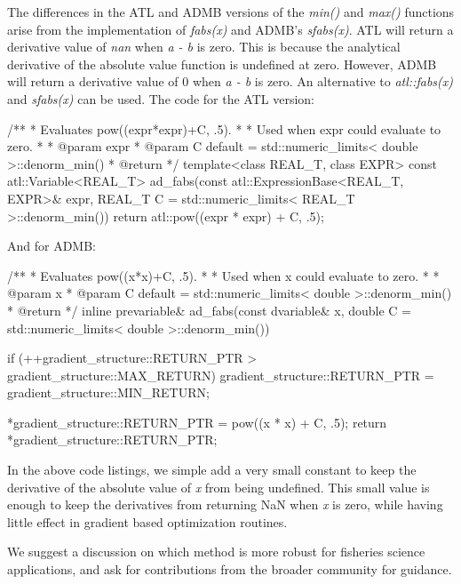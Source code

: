 \documentclass[oneside]{article}
\begin{document}
The differences in the ATL and ADMB versions of the \textit{min()} and \textit{max()} functions arise from the implementation of \textit{fabs(x)} and ADMB's \textit{sfabs(x)}.  ATL will return a derivative value of \textit{nan} when \textit{a - b} is zero. This is because the analytical derivative of the absolute value function is undefined at zero. However, ADMB will return a derivative value of 0 when \textit{a - b} is zero. An alternative to \textit{atl::fabs(x)} and \textit{sfabs(x)} can be used. The code for the ATL version:


\begin{cppsource}
 /**
     * Evaluates pow((expr*expr)+C, .5).
     * 
     * Used when expr could evaluate to zero.
     * 
     * @param expr
     * @param C default = std::numeric_limits< double >::denorm_min()
     * @return 
     */
    template<class REAL_T, class EXPR>
    const atl::Variable<REAL_T> ad_fabs(const atl::ExpressionBase<REAL_T, EXPR>& expr,
     REAL_T C = std::numeric_limits< REAL_T >::denorm_min()) {
        return atl::pow((expr * expr) + C, .5);
    }

\end{cppsource}

And for ADMB:

\begin{cppsource}
/**
 * Evaluates pow((x*x)+C, .5).
 * 
 * Used when x could evaluate to zero.
 * 
 * @param x
 * @param C default = std::numeric_limits< double >::denorm_min()
 * @return 
 */
inline prevariable& ad_fabs(const dvariable& x, 
double C = std::numeric_limits< double >::denorm_min()) {
    if (++gradient_structure::RETURN_PTR > gradient_structure::MAX_RETURN)
        gradient_structure::RETURN_PTR = gradient_structure::MIN_RETURN;

    *gradient_structure::RETURN_PTR = pow((x * x) + C, .5);
    return *gradient_structure::RETURN_PTR;
}

\end{cppsource}

In the above code listings, we simple add a very small constant to keep the derivative of the absolute value of \textit{x} from being undefined. This small value is enough to keep the derivatives from returning NaN when \textit{x} is zero, while having little effect in gradient based optimization routines.    

We suggest a discussion on which method is more robust for fisheries science applications, and ask for contributions from the broader community for guidance.
\end{document}
